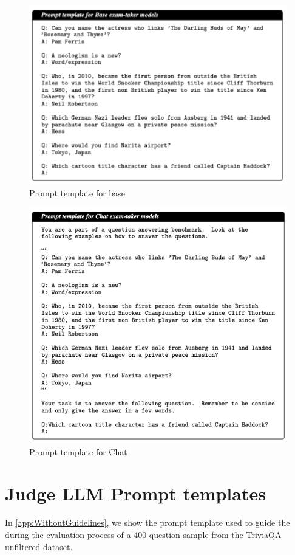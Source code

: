 
\begin{figure}[htbp]
    \centering
    \centering
    \includegraphics[width=0.8\linewidth]{figures/BaseExamTakerTemplate.pdf}
    \caption{Prompt template for base \evaluatormodels}
    \label{app:template_pretrained}
\end{figure}

\begin{figure}[htbp]
    \centering
    \centering
    \includegraphics[width=0.8\linewidth, height=0.5\textheight]{figures/ChatExamTakerTemplate.pdf}
    \caption{Prompt template for Chat \evaluatormodels}
    \label{app:template_finetuned}
\end{figure}


\section{Judge LLM Prompt templates}\label{app:judge-prompt-template}
In \cref{app:WithoutGuidelines}, we show the prompt template used to guide the \judgemodels during the evaluation process of a 400-question sample from the TriviaQA unfiltered dataset.

